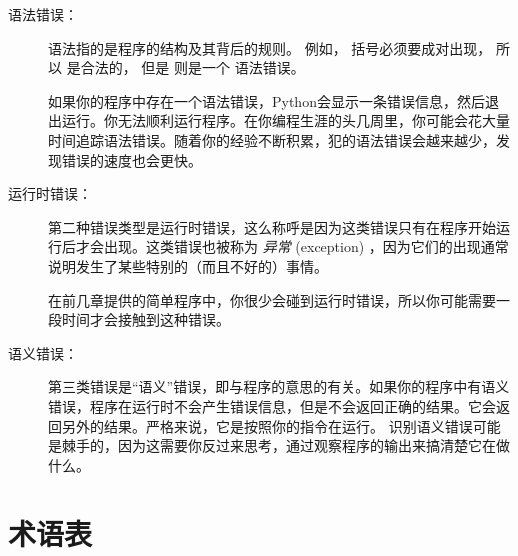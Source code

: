 \begin{description}

\item[语法错误：] 语法指的是程序的结构及其背后的规则。 例如， 括号必须要成对出现， 所以  是合法的， 但是  则是一个 语法错误。
  

如果你的程序中存在一个语法错误，Python会显示一条错误信息，然后退出运行。你无法顺利运行程序。在你编程生涯的头几周里，你可能会花大量时间追踪语法错误。随着你的经验不断积累，犯的语法错误会越来越少，发现错误的速度也会更快。


\item[运行时错误：] 第二种错误类型是运行时错误，这么称呼是因为这类错误只有在程序开始运行后才会出现。这类错误也被称为 {\em 异常} (exception) ，因为它们的出现通常说明发生了某些特别的（而且不好的）事情。
   
    
   
    

在前几章提供的简单程序中，你很少会碰到运行时错误，所以你可能需要一段时间才会接触到这种错误。


\item[语义错误：] 第三类错误是“语义”错误，即与程序的意思的有关。如果你的程序中有语义错误，程序在运行时不会产生错误信息，但是不会返回正确的结果。它会返回另外的结果。严格来说，它是按照你的指令在运行。
      
      
识别语义错误可能是棘手的，因为这需要你反过来思考，通过观察程序的输出来搞清楚它在做什么。

\end{description}


\section{术语表}


